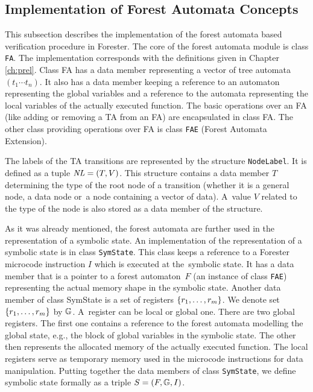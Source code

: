 \subsection{Implementation of Forest Automata Concepts}
\label{subsec:faimpl}

This subsection describes the implementation of the forest automata 
based verification procedure in Forester.
The core of the forest automata module is class {\tt FA}.
The implementation corresponds with the definitions given in Chapter \ref{ch:prel}.
Class FA has a data member representing a vector of tree automata $(t_1 \cdots t_n)$.
It also has a data member keeping a reference to an automaton representing the global variables
and a reference to the automata representing the local variables of the actually executed function. %
The basic operations over an FA (like adding or removing a TA from an FA) are encapsulated in class FA.
The other class providing operations over FA is class {\tt FAE} (Forest Automata Extension). 

The labels of the TA transitions are represented by the structure {\tt NodeLabel}.
It is defined as a tuple $\mathit{NL}=(T,V)$.
This structure contains a data member $T$ determining the type of the root node of a transition
(whether it is a general node, a data node or~a node containing a vector of data).
A~value $V$ related to the type of the node is also stored as a data member of the structure.

As it was already mentioned, the forest automata are further used in the representation of a symbolic state.
An implementation of the representation of a symbolic state is in class {\tt SymState}.
This class keeps a reference to a Forester microcode instruction $I$
which is executed at the~symbolic state.
It has a data member that is a pointer to a forest automaton~$F$ (an instance of class {\tt FAE})
representing the actual memory shape in the symbolic state.
Another data member of class SymState is a set of registers $\{r_1, \ldots, r_m\}$.
We denote set $\{r_1, \ldots, r_m\}$ by $\mathbb{G}$. 
A~register can be local or global one.
There are two global registers.
The first one contains a reference to the forest automata modelling
the global state, e.g., the block of global variables in the symbolic state.
The other then represents the allocated memory of the actually executed function.
The local registers serve as temporary memory used in
the microcode instructions for data manipulation.
Putting together the data members of class {\tt SymState},
we define symbolic state formally as a triple $S=(F, \mathbb{G}, I)$.


